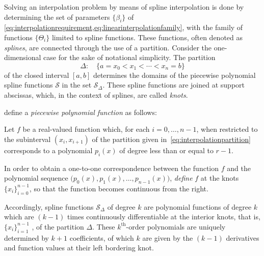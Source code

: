 Solving an interpolation problem by means of spline interpolation is done
by determining the set of parameters $\{\beta_{i}\}$ of
\cref{eq:interpolationrequirement,eq:linearinterpolationfamily}, with the
family of functions $\{\Theta_{i}\}$ limited to spline functions. These
functions, often denoted as \emph{splines}, are connected through the use
of a partition. Consider the one-dimensional case for the sake of notational
simplicity. The partition
\begin{equation}
    \label{eq:interpolationpartition}
    \Delta : \quad \{a = x_{0} < x_{1} < \cdots < x_{n} = b\}
\end{equation}
of the closed interval $[a,b]$ determines the domains of the piecewise
polynomial spline functions $\mathcal{S}$ in the set $\mathcal{S}_{\Delta}$.
These spline functions are joined at support abscissas, which, in the context
of splines, are called \emph{knots}.

\textcite[p.107]{stoer2002introduction} define a
\emph{piecewise polynomial function} as follows:
\begin{defn}
    \label{def:piecewise_polynomial}
    Let $f$ be a real-valued function which, for each $i=0,\ldots,n-1$, when
    restricted to the subinterval $(x_{i},x_{i+1})$ of the partition given
    in~\cref{eq:interpolationpartition} corresponds to a polynomial
    $p_{i}(x)$ of degree less than or equal to $r-1$.

    \vspace{-0.8\baselineskip}
    In order to obtain a one-to-one correspondence between the function $f$ and
    the polynomial sequence $\big(p_{0}(x),p_{1}(x),\ldots,p_{n-1}(x)\big)$,
    \emph{define} $f$ at the knots $\{x_{i}\}_{i=0}^{n-1}$, so that the
    function becomes continuous from the right.
\end{defn}

Accordingly, spline functions $\mathcal{S}_{\Delta}$ of degree $k$ are
polynomial functions of degree $k$ which are $(k-1)$ times continuously
differentiable at the interior knots, that is, $\{x_{i}\}_{i=1}^{n-1}$ , of the
partition $\Delta$. These $k^{\text{th}}$-order polynomials are uniquely
determined by $k+1$ coefficients, of which $k$ are given by the $(k-1)$
derivatives and function values at their left bordering knot.



